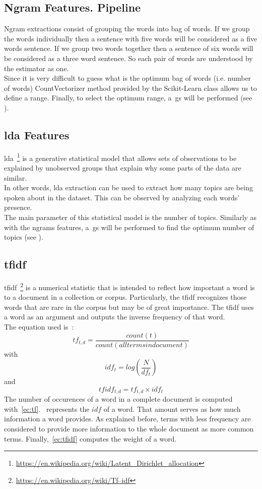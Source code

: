 \subsection{Ngram Features. Pipeline}
Ngram extractions consist of grouping the words into bag of words. If we group the words individually then a sentence with five words will be considered as a five words sentence. If we group two words together then a sentence of six words will be considered as a three word sentence. So each pair of words are understood by the estimator as one.\\
Since it is very difficult to guess what is the optimum bag of words (i.e. number of words) CountVectorizer method provided by the Scikit-Learn class allows us to define a range. Finally, to select the optimum range, a~\ac{gs} will be performed (see ).
\subsection{\acf{lda} Features}
\ac{lda}~\footnote{\url{https://en.wikipedia.org/wiki/Latent_Dirichlet_allocation}} is a generative statistical model that allows sets of observations to be explained by unobserved groups that explain why some parts of the data are similar.\\ In other words, \ac{lda} extraction can be used to extract how many topics are being spoken about in the dataset. This can be observed by analyzing each words' presence.\\
The main parameter of this statistical model is the number of topics. Similarly as with the ngrams features, a~\ac{gs} will be performed to find the optimum number of topics (see ).
\subsection{\acf{tfidf}}
\label{sec:tfidf}
\ac{tfidf}~\footnote{\url{https://en.wikipedia.org/wiki/Tf–idf}} is a numerical statistic that is intended to reflect how important a word is to a document in a collection or corpus. Particularly, the \ac{tfidf} recognizes those words that are rare in the corpus but may be of great importance. The \ac{tfidf} uses a word as an argument and outputs the inverse frequency of that word.\\
The equation used is~\cite{tfidf}:
\begin{equation}
\label{ec:tf}
	tf_{t,d} = \frac{count(t)}{count(alltermsindocument)}
\end{equation}
with
\begin{equation}
\label{ec:idf}
	idf_t=log(\frac{N}{df_t})
\end{equation}
and
\begin{equation}
\label{ec:tfidf}
	tfidf_{t,d}=tf_{t,d}\times idf_t
\end{equation}
The number of occurences of a word in a complete document is computed with~\cref{ec:tf}.~ represents the $idf$ of a word. That amount serves as how much information a word provides. As explained before, terms with less frequency are considered to provide more information to the whole document as more common terms. Finally,~\cref{ec:tfidf} computes the weight of a word.
